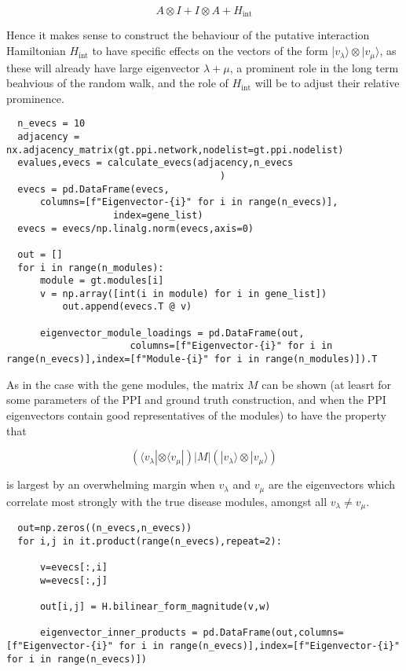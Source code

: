 \documentclass[a4paper,english]{article}
\begin{document}
  $$ A\otimes I + I \otimes A + H_{\mathrm{int}}$$
  
  Hence it makes sense to construct the behaviour of the putative interaction Hamiltonian $H_{\mathrm{int}}$ to have specific effects on the vectors  of the form |$v_\lambda \rangle \otimes | v_\mu \rangle$, as these will already have large eigenvector $\lambda + \mu$, a prominent role in the long term beahvious of the random walk, and the role of $H_{\mathrm{int}}$ will be to adjust their relative prominence. 
  
  
  
  
  
\begin{lstlisting}
  n_evecs = 10
  adjacency = nx.adjacency_matrix(gt.ppi.network,nodelist=gt.ppi.nodelist)
  evalues,evecs = calculate_evecs(adjacency,n_evecs
                                      )
  evecs = pd.DataFrame(evecs,
      columns=[f"Eigenvector-{i}" for i in range(n_evecs)],
                   index=gene_list)
  evecs = evecs/np.linalg.norm(evecs,axis=0)
  
  out = []
  for i in range(n_modules):
      module = gt.modules[i]
      v = np.array([int(i in module) for i in gene_list])
          out.append(evecs.T @ v)
      
      eigenvector_module_loadings = pd.DataFrame(out,
                      columns=[f"Eigenvector-{i}" for i in range(n_evecs)],index=[f"Module-{i}" for i in range(n_modules)]).T
\end{lstlisting}
  
  
  
  As in the case with the gene modules,  the matrix $M$ can be shown (at leasrt for some parameters of the PPI and ground truth construction, and when the PPI eigenvectors contain good representatives of the modules) to have the property that 
  
  $$ (\langle v_\lambda |\otimes \langle  v_\mu |)
   | M |  (|v_\lambda \rangle \otimes | v_\mu \rangle)
  $$
  
  is largest by an overwhelming margin when $v_\lambda$ and $v_\mu$ are the eigenvectors which correlate most strongly with the true disease modules, amongst all $v_\lambda \neq v_\mu$.
  
  
  
  
  
  
\begin{lstlisting}
  out=np.zeros((n_evecs,n_evecs))
  for i,j in it.product(range(n_evecs),repeat=2):
  
      v=evecs[:,i]
      w=evecs[:,j]
  
      out[i,j] = H.bilinear_form_magnitude(v,w)
      
      eigenvector_inner_products = pd.DataFrame(out,columns=[f"Eigenvector-{i}" for i in range(n_evecs)],index=[f"Eigenvector-{i}" for i in range(n_evecs)]) 
\end{lstlisting}
  
\end{document}
